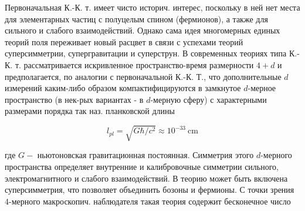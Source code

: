 \documentclass[10pt]{article}
\begin{document}
Первоначальная К.-К. т. имеет чисто историч. интерес, поскольку в ней нет места для элементарных частиц с полуцелым спином (фермионов), а также для сильного и слабого взаимодействий. Однако сама идея многомерных единых теорий поля переживает новый расцвет в связи с успехами теорий суперсимметрии, супергравитации и суперструн. В современных теориях типа К.-К. т. рассматривается искривленное пространство-время размерности $4+d$ и предполагается, по аналогии с первоначальной К.-К. Т., что дополнительные $d$ измерений каким-либо образом компактифицируются в замкнутое $d$-мерное пространство (в нек-рых вариантах - в $d$-мерную сферу) с характерными размерами порядка так наз. планковской длины



\[

l_{p l}=\sqrt{G \hbar / c^{2}} \approx 10^{-33} \mathrm{~cm}

\]



где $G-$ ньютоновская гравитационная постоянная. Симметрия этого $d$-мерного пространства определяет внутренние и калибровочные симметрии сильного, электромагнитного и слабого взаимодействий. В теорию может быть включена суперсимметрия, что позволяет объединить бозоны и фермионы. С точки зрения 4-мерного макроскопич. наблюдателя такая теория содержит бесконечное число
\end{document}
